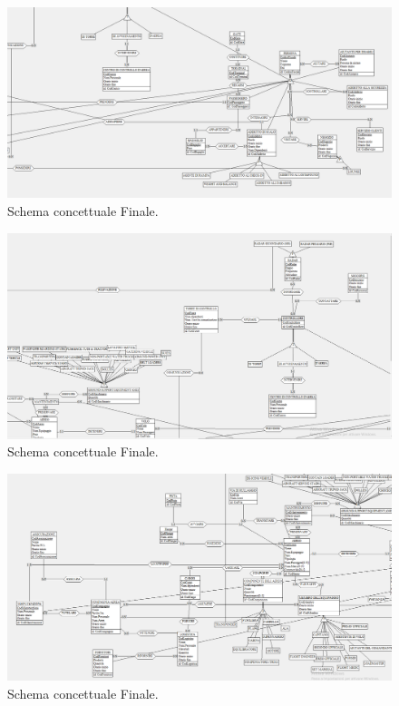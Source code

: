 \begin{figure}[H] %
	\centering
	\includegraphics[width=1.2\linewidth, height=1.2\textheight, keepaspectratio]{./img/Schema_Finale2.png}
	\caption{Schema concettuale Finale.}
	\label{fig:schema_finale2}
\end{figure}

\begin{figure}[H] %
	\centering
	\includegraphics[width=1.2\linewidth, height=1.2\textheight, keepaspectratio]{./img/Schema_Finale3.png}
	\caption{Schema concettuale Finale.}
	\label{fig:schema_finale3}
\end{figure}

\begin{figure}[H] %
	\centering
	\includegraphics[width=1.2\linewidth, height=1.2\textheight, keepaspectratio]{./img/Schema_Finale4.png}
	\caption{Schema concettuale Finale.}
	\label{fig:schema_finale4}
\end{figure}

\restoregeometry